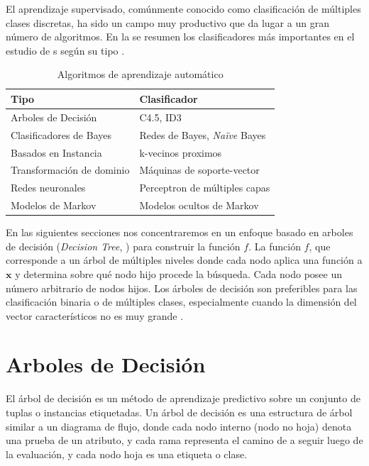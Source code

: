 El aprendizaje supervisado, comúnmente conocido como clasificación de múltiples clases discretas, ha sido un campo muy productivo que da lugar a un gran número de algoritmos. En la  se resumen los clasificadores más importantes en el estudio de s según su tipo \cite{LaraLabrador2013}.
\begin{table}[!htbp]
\begin{centering}
\begin{tabular}{|l|l|}
\hline 
		Tipo 						& Clasificador							\\
\hline 
\hline 
		Arboles de Decisión 		& C4.5, ID3								\\
\hline 
		Clasificadores de Bayes 	& Redes de Bayes, \emph{Naïve} Bayes	\\
\hline 
		Basados en Instancia 		& k-vecinos proximos					\\
\hline 
		Transformación de dominio 	& Máquinas de soporte-vector			\\
\hline 
		Redes neuronales 			& Perceptron de múltiples capas			\\
\hline 
		Modelos de Markov 			& Modelos ocultos de Markov				\\
\hline
\end{tabular}
\par\end{centering}
\caption[Algoritmos de ML]{\label{tab3:clasificadores} Algoritmos de aprendizaje automático}
\end{table}

En las siguientes secciones nos concentraremos en un enfoque basado en arboles de decisión (\emph{Decision Tree}, ) para construir la función $f$. La función $f$, que corresponde a un árbol de múltiples niveles donde cada nodo aplica una función a $\boldsymbol{x}$ y determina sobre qué nodo hijo procede la búsqueda. Cada nodo posee un número arbitrario de nodos hijos. Los árboles de decisión son preferibles para las clasificación binaria o de múltiples clases, especialmente cuando la dimensión del vector característicos no es muy grande \cite{Rajaraman2011}.

\section{Arboles de Decisión}
El árbol de decisión es un método de aprendizaje predictivo sobre un conjunto de tuplas o instancias etiquetadas. Un árbol de decisión es una estructura de árbol similar a un diagrama de flujo, donde cada nodo interno (nodo no hoja) denota una prueba de un atributo, y cada rama representa el camino de a seguir luego de la evaluación, y cada nodo hoja es una etiqueta o clase.


